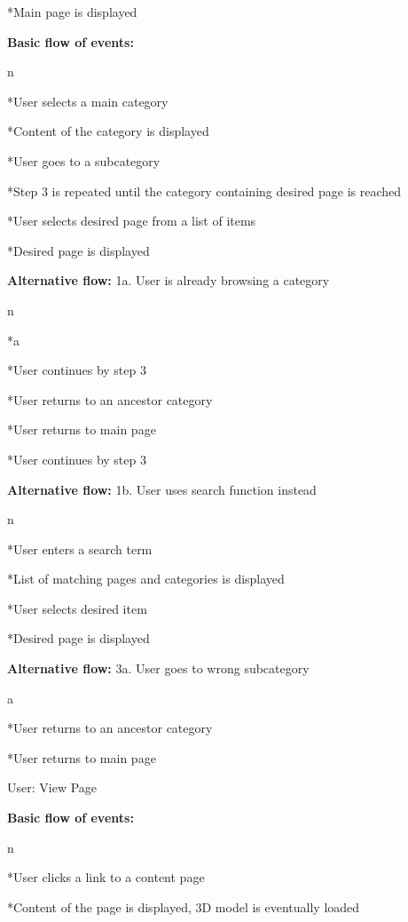 *Main page is displayed

\enditems

\enditems

{\bf Basic flow of events:}

\begitems \style n

*User selects a main category

*Content of the category is displayed

*User goes to a subcategory

*Step 3 is repeated until the category containing desired page is reached

*User selects desired page from a list of items

*Desired page is displayed

\enditems

{\bf Alternative flow:} 1a. User is already browsing a category

\begitems \style n

*\begitems \style a

*User continues by step 3

*User returns to an ancestor category

*User returns to main page

\enditems

*User continues by step 3

\enditems

{\bf Alternative flow:} 1b. User uses search function instead

\begitems \style n

*User enters a search term

*List of matching pages and categories is displayed

*User selects desired item

*Desired page is displayed

\enditems

{\bf Alternative flow:} 3a. User goes to wrong subcategory

\begitems \style a

*User returns to an ancestor category

*User returns to main page

\enditems

\secc User: View Page

{\bf Basic flow of events:}

\begitems \style n

*User clicks a link to a content page

*Content of the page is displayed, 3D model is eventually loaded


